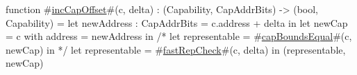 function #\hyperref[sailRISCVzincCapOffset]{incCapOffset}#(c, delta) : (Capability, CapAddrBits) -> (bool, Capability) =
    let newAddress : CapAddrBits = c.address + delta in
    let newCap     = { c with address = newAddress } in
    /* let representable = #\hyperref[sailRISCVzcapBoundsEqual]{capBoundsEqual}#(c, newCap) in */
    let representable = #\hyperref[sailRISCVzfastRepCheck]{fastRepCheck}#(c, delta) in
    (representable, newCap)
